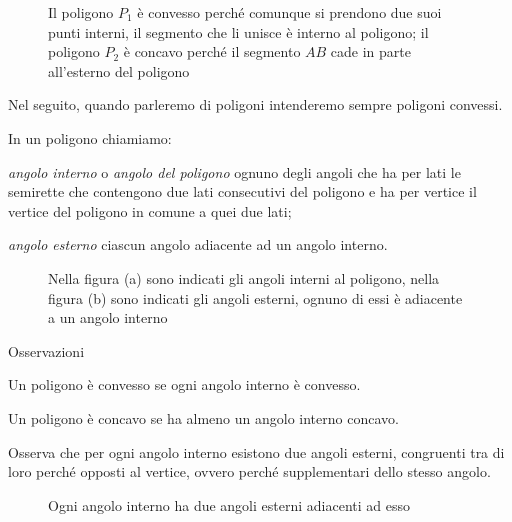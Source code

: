 \begin{inaccessibleblock}
 \begin{figure}[htb]
\centering
\caption{Il poligono \(P_1\) è convesso perché comunque si prendono due 
suoi punti interni, il segmento che li unisce è interno al poligono; 
il poligono \(P_2\) è concavo perché il segmento \(AB\) cade in parte 
all'esterno del poligono}
\end{figure}
\end{inaccessibleblock}

Nel seguito, quando parleremo di poligoni intenderemo sempre poligoni 
convessi.

\begin{definizione}
In un poligono chiamiamo:
\begin{itemize*}
\item \emph{angolo interno} o \emph{angolo del poligono} ognuno degli 
angoli che ha per lati le semirette che contengono due lati 
consecutivi del poligono e ha per vertice il vertice del poligono in 
comune a quei due lati;
\item \emph{angolo esterno} ciascun angolo adiacente ad un angolo 
interno.
\end{itemize*}
\end{definizione}


\begin{inaccessibleblock}
 \begin{figure}[htb]
\centering
\caption{Nella figura (a) sono indicati gli angoli interni al 
poligono, nella figura (b) sono indicati gli angoli esterni, ognuno 
di essi è adiacente a un angolo interno}
\end{figure}
\end{inaccessibleblock}

Osservazioni
\begin{itemize*}
\item Un poligono è convesso se ogni angolo interno è convesso.
\item Un poligono è concavo se ha almeno un angolo interno concavo.
\end{itemize*}

Osserva che per ogni angolo interno esistono due angoli esterni, 
congruenti tra di loro perché opposti al vertice, ovvero perché 
supplementari dello stesso angolo.


\begin{inaccessibleblock}
 \begin{figure}[htb]
\centering
\caption{Ogni angolo interno ha due angoli esterni adiacenti ad esso}
\end{figure}
\end{inaccessibleblock}

